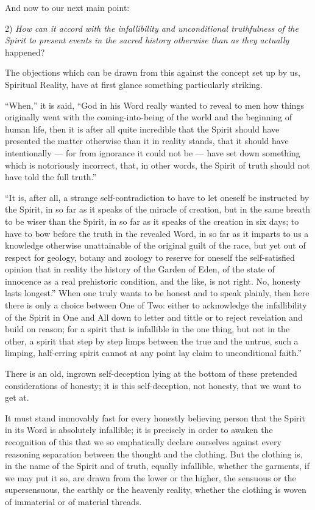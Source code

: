 \documentclass[12pt,a4paper,openany]{book}
\newcommand{\opage}[1]{\marginnote{\footnotesize\textit{[#1]}}}
\begin{document}
\setcounter{footnote}{0}%
\opage{312}And now to our next main point:

2) \emph{How can it accord with the infallibility
and unconditional truthfulness of the Spirit
to present events in the sacred history
otherwise than as they actually} happened?

The objections which can be drawn from this against
the concept set up by us, Spiritual Reality, have at
first glance something particularly striking.

``When,'' it is said, ``God in his Word really
wanted to reveal to men how things originally
went with the coming-into-being of the world and the beginning of human life, then it is
after all quite incredible that the Spirit should have presented the matter otherwise than
it in reality stands, that it should have intentionally
--- for from ignorance it could not be --- have
set down something which is notoriously incorrect, that, in
other words, the Spirit of truth should not have told the
full truth.''

``It is, after all, a strange self-contradiction to have to
let oneself be instructed by the Spirit, in so far as it speaks of
the miracle of creation, but in the same breath to be
wiser than the Spirit, in so far as it speaks of the creation
in six days; to have to bow before the truth in the
revealed Word, in so far as it imparts to us a knowledge
otherwise unattainable of the original guilt of the race,
but yet out of respect for geology, botany and zoology
to reserve for oneself the self-satisfied opinion that in reality
the history of the Garden of
Eden, of the state of innocence as a real prehistoric
condition, and the like, is not right. No, honesty lasts
\setcounter{footnote}{0}%
\opage{313}longest.'' When one truly wants to be honest and to speak plainly,
then here there is only a choice between One of Two: either to acknowledge
the infallibility of the Spirit in One and All down to letter and
tittle or to reject revelation and build on reason;
for a spirit that is infallible in the one thing, but
not in the other, a spirit that step by step limps
between the true and the untrue, such a limping,
half-erring spirit cannot at any point lay claim
to unconditional faith.''

There is an old, ingrown self-deception lying
at the bottom of these pretended considerations of honesty;
it is this self-deception, not honesty, that we want to get at.

It must stand immovably fast for every honestly believing person
that the Spirit in its Word is absolutely infallible; it is
precisely in order to awaken the recognition of this that we so emphatically
declare ourselves against every reasoning separation
between the thought and the clothing. But the clothing
is, in the name of the Spirit and of truth, equally infallible,
whether the garments, if we may put it so, are
drawn from the lower or the higher, the sensuous
or the supersensuous, the earthly or the heavenly
reality, whether the clothing is woven of immaterial
or of material threads.
\end{document}
